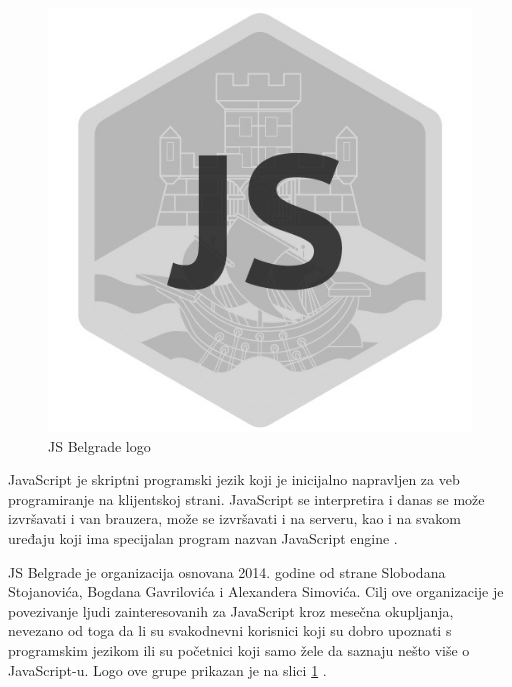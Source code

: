 \documentclass[a4paper]{article}
\begin{document}
{\begin{figure}[H]
\begin{center}
\includegraphics[scale=0.25]{JS_logo.png}
\end{center}
\caption{JS Belgrade logo}
\label{fig:JS_slika}
\end{figure}

JavaScript je skriptni programski jezik koji je inicijalno napravljen za veb programiranje na klijentskoj strani. JavaScript se interpretira i danas se može izvršavati i van brauzera, može se izvršavati i na serveru, kao i na svakom uređaju koji ima specijalan program nazvan JavaScript engine \cite{aboutJS}. 

JS Belgrade je organizacija osnovana 2014. godine od strane Slobodana Stojanovića, Bogdana Gavrilovića i Alexandera Simovića. Cilj ove organizacije je povezivanje ljudi zainteresovanih za JavaScript kroz mesečna okupljanja, nevezano od toga da li su svakodnevni korisnici koji su dobro upoznati s programskim jezikom ili su početnici koji samo žele da saznaju nešto više o JavaScript-u. Logo ove grupe prikazan je na slici \ref{fig:JS_slika} \cite{JS_Belgrade_meetup_pocetna}.

}
\end{document}
